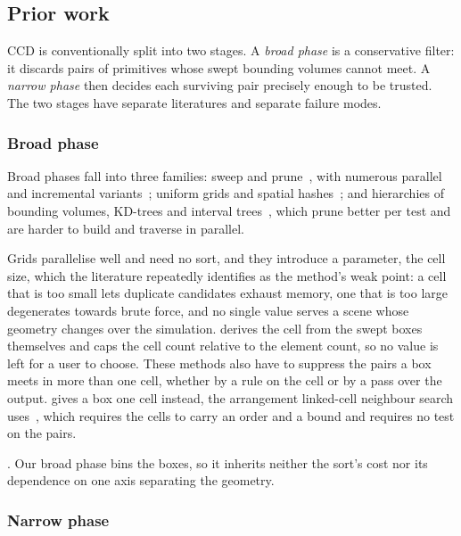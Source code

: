 \subsection{Prior work}
\label{sec:related}

CCD is conventionally split into two stages. A \emph{broad phase} is a
conservative filter: it discards pairs of primitives whose swept bounding
volumes cannot meet. A \emph{narrow phase} then decides each surviving pair
precisely enough to be trusted. The two stages have separate literatures and
separate failure modes.

\subsubsection{Broad phase}

Broad phases fall into three families: sweep and
prune~\citep{baraff1992dynamic,cohen1995icollide}, with numerous parallel and
incremental
variants~\citep{capannini2018adaptive,tracy2009sweep,liu2010realtime}; uniform
grids and spatial hashes~\citep{tang2018icloth,tang2018pscc}; and hierarchies of
bounding volumes, KD-trees and interval
trees~\citep{serpa2019kdtree,serpa2020broadmark,zomorodian2000boxes}, which
prune better per test and are harder to build and traverse in parallel.

Grids parallelise well and need no sort, and they introduce a parameter, the
cell size, which the literature repeatedly identifies as the method's weak
point: a cell that is too small lets duplicate candidates exhaust memory, one
that is too large degenerates towards brute force, and no single value serves a
scene whose geometry changes over the simulation.  derives the
cell from the swept boxes themselves and caps the cell count relative to the
element count, so no value is left for a user to choose. These methods also have to suppress the pairs a box meets in more
than one cell, whether by a rule on the cell or by a pass over the output.
 gives a box one cell instead, the arrangement linked-cell
neighbour search uses~\citep{allen2017liquids}, which requires the cells to
carry an order and a bound and requires no test on the pairs.

\silentoverflow. Our broad
phase bins the boxes, so it inherits neither the sort's cost nor its dependence
on one axis separating the geometry.

\subsubsection{Narrow phase}

